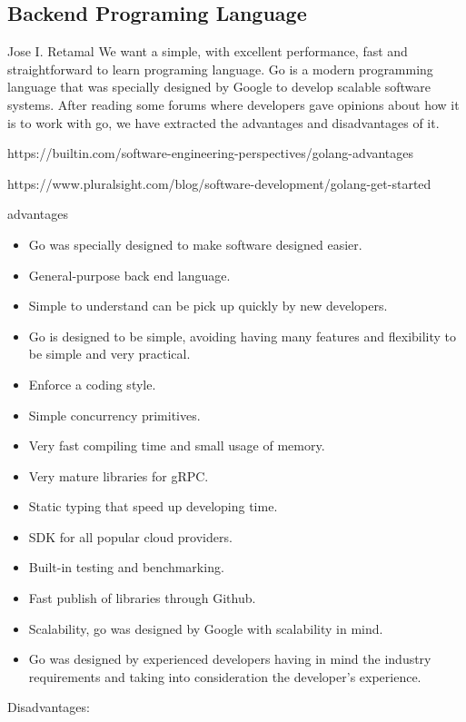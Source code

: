 \subsection{Backend Programing Language}
Jose I. Retamal
\vskip 0.1in
\indent
\indent
We want a simple, with excellent performance, fast and straightforward to learn programing language. Go is a modern programming language that was specially designed by Google to develop scalable software systems. 
After reading some forums where developers gave opinions about how it is to work with go, we have extracted the advantages and disadvantages of it.

https://builtin.com/software-engineering-perspectives/golang-advantages

https://www.pluralsight.com/blog/software-development/golang-get-started

advantages

\begin{itemize}
	\item Go was specially designed to make software designed easier.
	
	\item General-purpose back end language.
	\item Simple to understand can be pick up quickly by new developers.
	\item Go is designed to be simple, avoiding having many features and flexibility to be simple and very practical.
	\item Enforce a coding style.
	\item Simple concurrency primitives.
	\item Very fast compiling time and small usage of memory.
	\item Very mature libraries for gRPC.
	\item Static typing that speed up developing time.
	\item SDK for all popular cloud providers.
	\item Built-in testing and benchmarking.
	\item Fast publish of libraries through Github.
	\item Scalability, go was designed by Google with scalability in mind.
	\item Go was designed by experienced developers having in mind the industry requirements and taking into consideration the developer's experience. 
	
\end{itemize}

Disadvantages:

